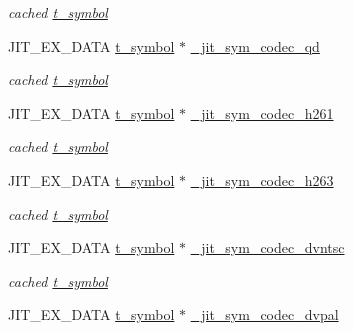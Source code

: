 \begin{DoxyCompactItemize}
\begin{DoxyCompactList}\small\item\em cached \hyperlink{structt__symbol}{t\_\-symbol} \item\end{DoxyCompactList}\item 
\hypertarget{group__jitter_ga8bd39e0232734a56bd3dad9ce443aa3c}{
JIT\_\-EX\_\-DATA \hyperlink{structt__symbol}{t\_\-symbol} $\ast$ \hyperlink{group__jitter_ga8bd39e0232734a56bd3dad9ce443aa3c}{\_\-jit\_\-sym\_\-codec\_\-qd}}
\label{group__jitter_ga8bd39e0232734a56bd3dad9ce443aa3c}

\begin{DoxyCompactList}\small\item\em cached \hyperlink{structt__symbol}{t\_\-symbol} \item\end{DoxyCompactList}\item 
\hypertarget{group__jitter_gaeaed0103ad5e42520ae0142b783c312d}{
JIT\_\-EX\_\-DATA \hyperlink{structt__symbol}{t\_\-symbol} $\ast$ \hyperlink{group__jitter_gaeaed0103ad5e42520ae0142b783c312d}{\_\-jit\_\-sym\_\-codec\_\-h261}}
\label{group__jitter_gaeaed0103ad5e42520ae0142b783c312d}

\begin{DoxyCompactList}\small\item\em cached \hyperlink{structt__symbol}{t\_\-symbol} \item\end{DoxyCompactList}\item 
\hypertarget{group__jitter_gad37e3c153d7b5df76ed4a3f593045261}{
JIT\_\-EX\_\-DATA \hyperlink{structt__symbol}{t\_\-symbol} $\ast$ \hyperlink{group__jitter_gad37e3c153d7b5df76ed4a3f593045261}{\_\-jit\_\-sym\_\-codec\_\-h263}}
\label{group__jitter_gad37e3c153d7b5df76ed4a3f593045261}

\begin{DoxyCompactList}\small\item\em cached \hyperlink{structt__symbol}{t\_\-symbol} \item\end{DoxyCompactList}\item 
\hypertarget{group__jitter_ga79c8c7827e10f38fcd5f0c3956f35a15}{
JIT\_\-EX\_\-DATA \hyperlink{structt__symbol}{t\_\-symbol} $\ast$ \hyperlink{group__jitter_ga79c8c7827e10f38fcd5f0c3956f35a15}{\_\-jit\_\-sym\_\-codec\_\-dvntsc}}
\label{group__jitter_ga79c8c7827e10f38fcd5f0c3956f35a15}

\begin{DoxyCompactList}\small\item\em cached \hyperlink{structt__symbol}{t\_\-symbol} \item\end{DoxyCompactList}\item 
\hypertarget{group__jitter_ga2a8a6846182a5f1ea38694699c4153b2}{
JIT\_\-EX\_\-DATA \hyperlink{structt__symbol}{t\_\-symbol} $\ast$ \hyperlink{group__jitter_ga2a8a6846182a5f1ea38694699c4153b2}{\_\-jit\_\-sym\_\-codec\_\-dvpal}}
\label{group__jitter_ga2a8a6846182a5f1ea38694699c4153b2}


\end{DoxyCompactItemize}
